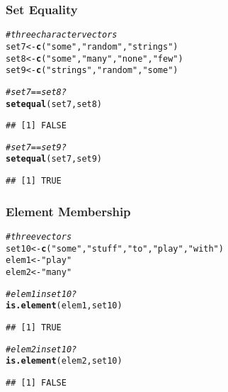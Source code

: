 \documentclass[12pt]{beamer}\usepackage[]{graphicx}\usepackage[]{color}
\makeatletter
\newcommand{\hlstr}[1]{\textcolor[rgb]{0.192,0.494,0.8}{#1}}%
\newcommand{\hlcom}[1]{\textcolor[rgb]{0.678,0.584,0.686}{\textit{#1}}}%
\newcommand{\hlstd}[1]{\textcolor[rgb]{0.345,0.345,0.345}{#1}}%
\newcommand{\hlkwb}[1]{\textcolor[rgb]{0.69,0.353,0.396}{#1}}%
\newcommand{\hlkwd}[1]{\textcolor[rgb]{0.737,0.353,0.396}{\textbf{#1}}}%
\newenvironment{kframe}{%
 \def\at@end@of@kframe{}%
 \ifinner\ifhmode%
  \def\at@end@of@kframe{\end{minipage}}%
  \begin{minipage}{\columnwidth}%
 \fi\fi%
 \def\FrameCommand##1{\hskip\@totalleftmargin \hskip-\fboxsep
 \colorbox{shadecolor}{##1}\hskip-\fboxsep
     \hskip-\linewidth \hskip-\@totalleftmargin \hskip\columnwidth}%
 \MakeFramed {\advance\hsize-\width
   \@totalleftmargin\z@ \linewidth\hsize
   \@setminipage}}%
 {\par\unskip\endMakeFramed%
 \at@end@of@kframe}
\newenvironment{knitrout}{}{} %
\makeatother
\begin{document}

\begin{frame}[fragile]
\frametitle{Set Equality}

\begin{knitrout}\footnotesize
{}\color{fgcolor}\begin{kframe}
\begin{alltt}
\hlcom{# three character vectors}
\hlstd{set7} \hlkwb{<-} \hlkwd{c}\hlstd{(}\hlstr{"some"}\hlstd{,} \hlstr{"random"}\hlstd{,} \hlstr{"strings"}\hlstd{)}
\hlstd{set8} \hlkwb{<-} \hlkwd{c}\hlstd{(}\hlstr{"some"}\hlstd{,} \hlstr{"many"}\hlstd{,} \hlstr{"none"}\hlstd{,} \hlstr{"few"}\hlstd{)}
\hlstd{set9} \hlkwb{<-} \hlkwd{c}\hlstd{(}\hlstr{"strings"}\hlstd{,} \hlstr{"random"}\hlstd{,} \hlstr{"some"}\hlstd{)}

\hlcom{# set7 == set8?}
\hlkwd{setequal}\hlstd{(set7, set8)}
\end{alltt}
\begin{verbatim}
## [1] FALSE
\end{verbatim}
\begin{alltt}
\hlcom{# set7 == set9?}
\hlkwd{setequal}\hlstd{(set7, set9)}
\end{alltt}
\begin{verbatim}
## [1] TRUE
\end{verbatim}
\end{kframe}
\end{knitrout}

\end{frame}


\begin{frame}[fragile]
\frametitle{Element Membership}

\begin{knitrout}\footnotesize
{}\color{fgcolor}\begin{kframe}
\begin{alltt}
\hlcom{# three vectors}
\hlstd{set10} \hlkwb{<-} \hlkwd{c}\hlstd{(}\hlstr{"some"}\hlstd{,} \hlstr{"stuff"}\hlstd{,} \hlstr{"to"}\hlstd{,} \hlstr{"play"}\hlstd{,} \hlstr{"with"}\hlstd{)}
\hlstd{elem1} \hlkwb{<-} \hlstr{"play"}
\hlstd{elem2} \hlkwb{<-} \hlstr{"many"}

\hlcom{# elem1 in set10?}
\hlkwd{is.element}\hlstd{(elem1, set10)}
\end{alltt}
\begin{verbatim}
## [1] TRUE
\end{verbatim}
\begin{alltt}
\hlcom{# elem2 in set10?}
\hlkwd{is.element}\hlstd{(elem2, set10)}
\end{alltt}
\begin{verbatim}
## [1] FALSE
\end{verbatim}
\end{kframe}
\end{knitrout}

\end{frame}
\end{document}
